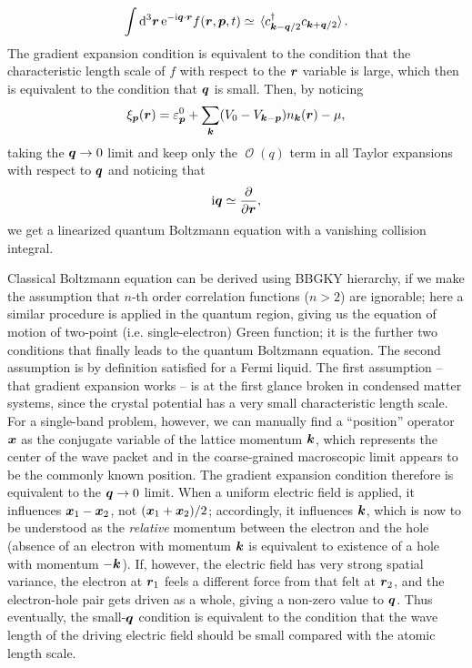 \documentclass[hyperref, a4paper]{article}
\newcommand*{\ii}{\mathrm{i}}
\newcommand*{\ee}{\mathrm{e}}
\DeclareMathOperator{\bigO}{\mathcal{O}}
\begin{document}
\begin{equation}
    \int \dd[3]{\vb*{r}} \ee^{- \ii \vb*{q} \cdot \vb*{r}} f(\vb*{r}, \vb*{p}, t)
    \simeq \expval*{c^\dagger_{\vb*{k} - \vb*{q} / 2} c_{\vb*{k} + \vb*{q} / 2}} .
\end{equation}
The gradient expansion condition is equivalent to the condition that 
the characteristic length scale of $f$ with respect to the $\vb*{r}$ variable is large,
which then is equivalent to the condition that $\vb*{q}$ is small.
Then, by noticing 
\begin{equation}
    \xi_{\vb*{p}}(\vb*{r}) = \varepsilon^0_{\vb*{p}}
    + \sum_{\vb*{k}} (V_{0} - V_{\vb*{k} - \vb*{p}} ) n_{\vb*{k}}(\vb*{r}) - \mu,
    \label{eq:simple-fermi-liquid-xi}
\end{equation}
taking the $\vb*{q} \to 0$ limit and keep only the $\bigO(q)$ term in all Taylor expansions 
with respect to $\vb*{q}$
and noticing that 
\[
    \ii \vb*{q} \simeq \pdv{\vb*{r}},
\]
we get a linearized quantum Boltzmann equation with a vanishing collision integral.

Classical Boltzmann equation can be derived using 
BBGKY hierarchy,
if we make the assumption that $n$-th order correlation functions ($n > 2$) 
are ignorable; 
here a similar procedure is applied in the quantum region, 
giving us the equation of motion 
of two-point (i.e. single-electron) Green function;
it is the further two conditions that
finally leads to the quantum Boltzmann equation.
The second assumption is by definition satisfied for a Fermi liquid.
The first assumption -- that gradient expansion works -- is at the first glance 
broken in condensed matter systems, 
since the crystal potential has a very small characteristic length scale.
For a single-band problem, however, 
we can manually find a ``position'' operator $\vb*{x}$ as the conjugate variable 
of the lattice momentum $\vb*{k}$,
which represents the center of the wave packet 
and in the coarse-grained macroscopic limit 
appears to be the commonly known position.
The gradient expansion condition therefore is equivalent to the $\vb*{q} \to 0$ limit.
When a uniform electric field is applied, 
it influences $\vb*{x}_1 - \vb*{x}_2$, not $(\vb*{x}_1 + \vb*{x}_2) / 2$;
accordingly, it influences $\vb*{k}$, 
which is now to be understood as the \emph{relative} momentum 
between the electron and the hole 
(absence of an electron with momentum $\vb*{k}$ 
is equivalent to existence of a hole with momentum $- \vb*{k}$).
If, however, the electric field has very strong spatial variance, 
the electron at $\vb*{r}_1$ feels a different force 
from that felt at $\vb*{r}_2$,
and the electron-hole pair gets driven as a whole,
giving a non-zero value to $\vb*{q}$.
Thus eventually, 
the small-$\vb*{q}$ condition is equivalent to 
the condition that the wave length of the driving electric field 
should be small compared with the atomic length scale.
\end{document}
